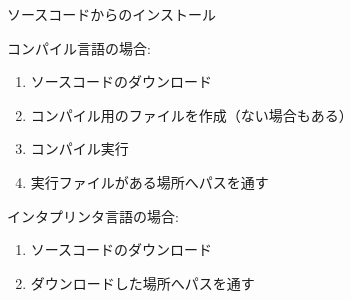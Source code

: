 \documentclass[
  ignorenonframetext,
]{beamer}
\providecommand{\tightlist}{%
  \setlength{\itemsep}{0pt}\setlength{\parskip}{0pt}}\usepackage{longtable,booktabs,array}
\begin{document}
\begin{frame}{ソースコードからのインストール}
\protect\hypertarget{ux30bdux30fcux30b9ux30b3ux30fcux30c9ux304bux3089ux306eux30a4ux30f3ux30b9ux30c8ux30fcux30eb}{}
\begin{block}{コンパイル言語の場合:}
\protect\hypertarget{ux30b3ux30f3ux30d1ux30a4ux30ebux8a00ux8a9eux306eux5834ux5408}{}
\begin{enumerate}[<+->]
\tightlist
\item
  ソースコードのダウンロード
\item
  コンパイル用のファイルを作成（ない場合もある）
\item
  コンパイル実行
\item
  実行ファイルがある場所へパスを通す
\end{enumerate}
\end{block}

\begin{block}{インタプリンタ言語の場合:}
\protect\hypertarget{ux30a4ux30f3ux30bfux30d7ux30eaux30f3ux30bfux8a00ux8a9eux306eux5834ux5408}{}
\begin{enumerate}[<+->]
\tightlist
\item
  ソースコードのダウンロード
\item
  ダウンロードした場所へパスを通す
\end{enumerate}
\end{block}
\end{frame}
\end{document}

